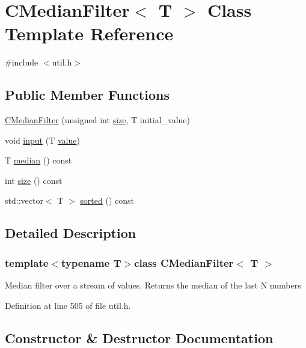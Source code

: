 \hypertarget{class_c_median_filter}{}\section{C\+Median\+Filter$<$ T $>$ Class Template Reference}
\label{class_c_median_filter}


{\ttfamily \#include $<$util.\+h$>$}

\subsection*{Public Member Functions}
\begin{DoxyCompactItemize}
\item 
\hyperlink{class_c_median_filter_a181463ed081ece10fd437875243d9cad}{C\+Median\+Filter} (unsigned int \hyperlink{class_c_median_filter_a0791303910a3a11adbc127f9fe4e3a9e}{size}, T initial\+\_\+value)
\item 
void \hyperlink{class_c_median_filter_ae10cde98866b034ec73c530be4c60874}{input} (T \hyperlink{cache_8cc_a0f61d63b009d0880a89c843bd50d8d76}{value})
\item 
T \hyperlink{class_c_median_filter_aab6b67fbb63024c462bfa30bbe789c31}{median} () const 
\item 
int \hyperlink{class_c_median_filter_a0791303910a3a11adbc127f9fe4e3a9e}{size} () const 
\item 
std\+::vector$<$ T $>$ \hyperlink{class_c_median_filter_afbfe7258f17cec5cc7f2f105d03b0567}{sorted} () const 
\end{DoxyCompactItemize}


\subsection{Detailed Description}
\subsubsection*{template$<$typename T$>$class C\+Median\+Filter$<$ T $>$}

Median filter over a stream of values. Returns the median of the last N numbers 

Definition at line 505 of file util.\+h.



\subsection{Constructor \& Destructor Documentation}
\hypertarget{class_c_median_filter_a181463ed081ece10fd437875243d9cad}{}
